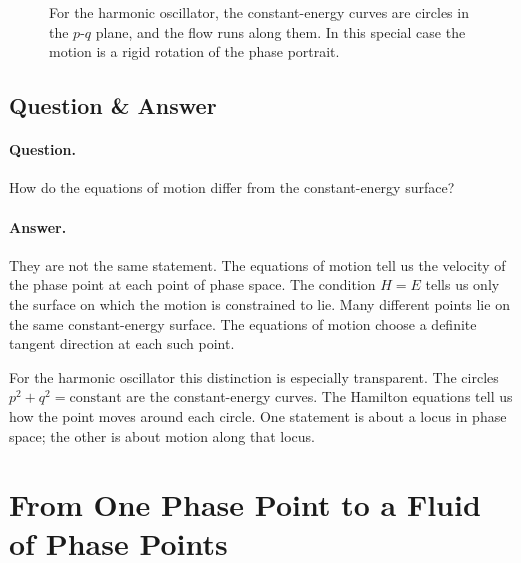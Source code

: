 \begin{figure}[h]
\centering
{}
\caption{For the harmonic oscillator, the constant-energy curves are circles in the \(p\)-\(q\) plane, and the flow runs along them. In this special case the motion is a rigid rotation of the phase portrait.}
\end{figure}

\subsection{Question \& Answer}

\paragraph{Question.} How do the equations of motion differ from the constant-energy surface?

\paragraph{Answer.} They are not the same statement. The equations of motion tell us the velocity of the phase point at each point of phase space. The condition \(H=E\) tells us only the surface on which the motion is constrained to lie. Many different points lie on the same constant-energy surface. The equations of motion choose a definite tangent direction at each such point.

For the harmonic oscillator this distinction is especially transparent. The circles \(p^2+q^2=\text{constant}\) are the constant-energy curves. The Hamilton equations tell us how the point moves around each circle. One statement is about a locus in phase space; the other is about motion along that locus.

\section{From One Phase Point to a Fluid of Phase Points}


